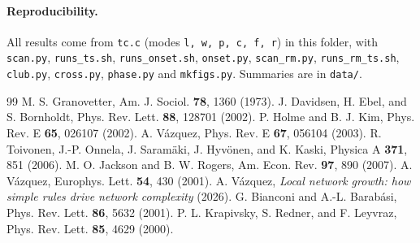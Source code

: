 \documentclass[aps,pre,twocolumn,superscriptaddress,floatfix,nofootinbib]{revtex4-2}
\begin{document}
\paragraph*{Reproducibility.}
All results come from \texttt{tc.c} (modes \texttt{l, w, p, c, f, r}) in this
folder, with \texttt{scan.py}, \texttt{runs\_ts.sh}, \texttt{runs\_onset.sh},
\texttt{onset.py}, \texttt{scan\_rm.py}, \texttt{runs\_rm\_ts.sh}, \texttt{club.py},
\texttt{cross.py}, \texttt{phase.py} and \texttt{mkfigs.py}. Summaries are in \texttt{data/}.

\begin{thebibliography}{99}
 M. S. Granovetter, Am. J. Sociol. \textbf{78}, 1360 (1973).
 J. Davidsen, H. Ebel, and S. Bornholdt, Phys. Rev. Lett. \textbf{88}, 128701 (2002).
 P. Holme and B. J. Kim, Phys. Rev. E \textbf{65}, 026107 (2002).
 A. V\'azquez, Phys. Rev. E \textbf{67}, 056104 (2003).
 R. Toivonen, J.-P. Onnela, J. Saram\"aki, J. Hyv\"onen, and K. Kaski, Physica A \textbf{371}, 851 (2006).
 M. O. Jackson and B. W. Rogers, Am. Econ. Rev. \textbf{97}, 890 (2007).
 A. V\'azquez, Europhys. Lett. \textbf{54}, 430 (2001).
 A. V\'azquez, \emph{Local network growth: how simple rules drive network complexity} (2026).
 G. Bianconi and A.-L. Barab\'asi, Phys. Rev. Lett. \textbf{86}, 5632 (2001).
 P. L. Krapivsky, S. Redner, and F. Leyvraz, Phys. Rev. Lett. \textbf{85}, 4629 (2000).
\end{thebibliography}
\end{document}
